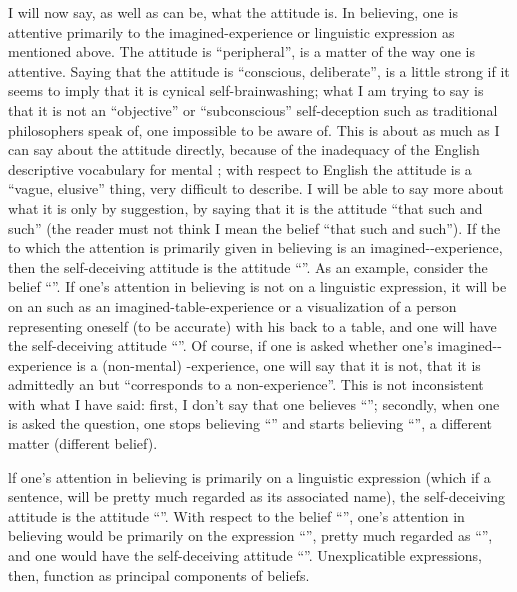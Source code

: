 I will now say, as well as can be, what the attitude is. In believing, one 
is attentive primarily to the imagined-experience or linguistic expression as 
mentioned above. The attitude is \enquote{peripheral}, is a matter of the way one is 
attentive. Saying that the attitude is \enquote{conscious, deliberate}, is a little 
strong if it seems to imply that it is cynical self-brainwashing; what I am 
trying to say is that it is not an \enquote{objective} or \enquote{subconscious} self-deception 
such as traditional philosophers speak of, one impossible to be aware of. This 
is about as much as I can say about the attitude directly, because of the 
inadequacy of the English descriptive vocabulary for mental ; 
with respect to English the attitude is a \enquote{vague, elusive} thing, very difficult 
to describe. I will be able to say more about what it is only by suggestion, by 
saying that it is the attitude \enquote{that such and such} (the reader must not think 
I mean the belief \enquote{that such and such}). If the  to which the 
attention is primarily given in believing is an imagined-\x-experience, then the 
self-deceiving attitude is the attitude \enquote{}. As an example, consider the belief \enquote{}. If one's attention in believing is not on a linguistic 
expression, it will be on an  such as an 
imagined-table-experience or a visualization of a person representing oneself 
(to be accurate) with his back to a table, and one will have the self-deceiving 
attitude \enquote{}. Of course, if one is asked whether one's imagined-\x-experience is 
a (non-mental) \x-experience, one will say that it is not, that it is admittedly 
an  but \enquote{corresponds to a non-experience}. This is not 
inconsistent with what I have said: first, I don't say that one believes \enquote{}; secondly, when one is asked 
the question, one stops believing \enquote{} and starts 
believing \enquote{}, a different matter (different belief). 

lf one's attention in believing is primarily on a linguistic expression 
(which if a sentence, will be pretty much regarded as its associated name), 
the self-deceiving attitude is the attitude \enquote{}. With respect to the belief \enquote{}, one's 
attention in believing would be primarily on the expression \enquote{}, pretty much regarded as \enquote{}, and 
one would have the self-deceiving attitude \enquote{}. 
Unexplicatible expressions, then, function as principal components of 
beliefs. 

